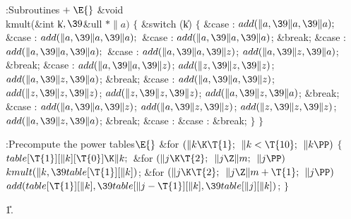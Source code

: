 \Y\B\4:Subroutines\X${}\mathrel+\E{}$\6
\&{void} \\{kmult}(\&{int} \|k${},\39{}$\&{ull} ${}{*}\|a){}$\1\1\2\2\6
${}\{{}$\1\6
\&{switch} (\|k)\5
${}\{{}$\1\6
\4\&{case} :\5
${}\\{add}(\|a,\39\|a,\39\|a);{}$\6
\4\&{case} :\5
${}\\{add}(\|a,\39\|a,\39\|a);{}$\6
\4\&{case} :\5
${}\\{add}(\|a,\39\|a,\39\|a){}$;\5
\&{break};\6
\4\&{case} :\5
${}\\{add}(\|a,\39\|a,\39\|a);{}$\6
\4\&{case} :\5
${}\\{add}(\|a,\39\|a,\39\|z){}$;\5
${}\\{add}(\|a,\39\|z,\39\|a){}$;\5
\&{break};\6
\4\&{case} :\5
${}\\{add}(\|a,\39\|a,\39\|z){}$;\5
${}\\{add}(\|z,\39\|z,\39\|z){}$;\5
${}\\{add}(\|a,\39\|z,\39\|a){}$;\5
\&{break};\6
\4\&{case} :\5
${}\\{add}(\|a,\39\|a,\39\|z){}$;\5
${}\\{add}(\|z,\39\|z,\39\|z){}$;\5
${}\\{add}(\|z,\39\|z,\39\|z){}$;\5
${}\\{add}(\|a,\39\|z,\39\|a){}$;\5
\&{break};\6
\4\&{case} :\5
${}\\{add}(\|a,\39\|a,\39\|z){}$;\5
${}\\{add}(\|a,\39\|z,\39\|z){}$;\5
${}\\{add}(\|z,\39\|z,\39\|z){}$;\5
${}\\{add}(\|a,\39\|z,\39\|a){}$;\5
\&{break};\6
\4\&{case} :\5
\&{case} :\5
\&{break};\6
\4${}\}{}$\2\6
\4${}\}{}$\2\par
\fi

\B{}:Precompute the power tables\X${}\E{}$\6
\&{for} ${}(\|k\K\T{1};{}$ ${}\|k<\T{10};{}$ ${}\|k\PP){}$\5
${}\{{}$\1\6
${}\\{table}[\T{1}][\|k][\T{0}]\K\|k;{}$\6
\&{for} ${}(\|j\K\T{2};{}$ ${}\|j\Z\|m;{}$ ${}\|j\PP){}$\1\5
${}\\{kmult}(\|k,\39\\{table}[\T{1}][\|k]){}$;\2\6
\&{for} ${}(\|j\K\T{2};{}$ ${}\|j\Z\|m+\T{1};{}$ ${}\|j\PP){}$\1\5
${}\\{add}(\\{table}[\T{1}][\|k],\39\\{table}[\|j-\T{1}][\|k],\39\\{table}[%
\|j][\|k]){}$;\2\6
\4${}\}{}$\2\par
\U1.\fi

